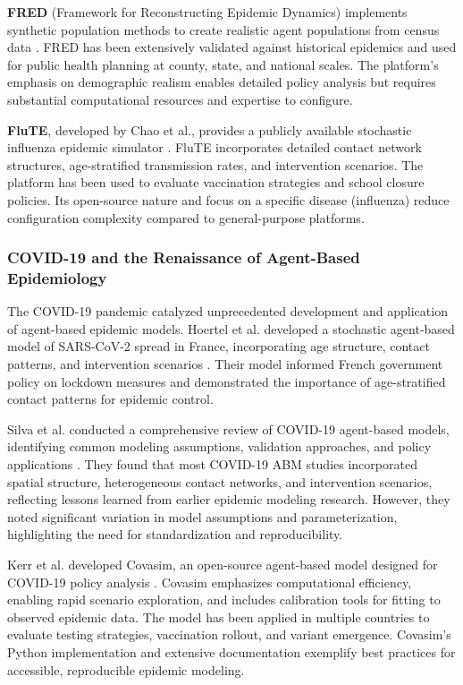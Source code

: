 \textbf{FRED} (Framework for Reconstructing Epidemic Dynamics) implements synthetic population methods to create realistic agent populations from census data \cite{grefenstette2013fred}. FRED has been extensively validated against historical epidemics and used for public health planning at county, state, and national scales. The platform's emphasis on demographic realism enables detailed policy analysis but requires substantial computational resources and expertise to configure.

\textbf{FluTE}, developed by Chao et al., provides a publicly available stochastic influenza epidemic simulator \cite{chao2020modeling}. FluTE incorporates detailed contact network structures, age-stratified transmission rates, and intervention scenarios. The platform has been used to evaluate vaccination strategies and school closure policies. Its open-source nature and focus on a specific disease (influenza) reduce configuration complexity compared to general-purpose platforms.

\subsubsection{COVID-19 and the Renaissance of Agent-Based Epidemiology}

The COVID-19 pandemic catalyzed unprecedented development and application of agent-based epidemic models. Hoertel et al. developed a stochastic agent-based model of SARS-CoV-2 spread in France, incorporating age structure, contact patterns, and intervention scenarios \cite{hoertel2020stochastic}. Their model informed French government policy on lockdown measures and demonstrated the importance of age-stratified contact patterns for epidemic control.

Silva et al. conducted a comprehensive review of COVID-19 agent-based models, identifying common modeling assumptions, validation approaches, and policy applications \cite{silva2020covid}. They found that most COVID-19 ABM studies incorporated spatial structure, heterogeneous contact networks, and intervention scenarios, reflecting lessons learned from earlier epidemic modeling research. However, they noted significant variation in model assumptions and parameterization, highlighting the need for standardization and reproducibility.

Kerr et al. developed Covasim, an open-source agent-based model designed for COVID-19 policy analysis \cite{kerr2021covasim}. Covasim emphasizes computational efficiency, enabling rapid scenario exploration, and includes calibration tools for fitting to observed epidemic data. The model has been applied in multiple countries to evaluate testing strategies, vaccination rollout, and variant emergence. Covasim's Python implementation and extensive documentation exemplify best practices for accessible, reproducible epidemic modeling.

